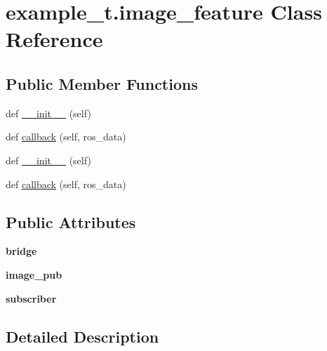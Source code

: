 \hypertarget{classexample__t_1_1image__feature}{}\section{example\+\_\+t.\+image\+\_\+feature Class Reference}
\label{classexample__t_1_1image__feature}
\subsection*{Public Member Functions}
\begin{DoxyCompactItemize}
\item 
def \hyperlink{classexample__t_1_1image__feature_ab7ca3d6ed3e0a021664f3227a389914b}{\+\_\+\+\_\+init\+\_\+\+\_\+} (self)
\item 
def \hyperlink{classexample__t_1_1image__feature_a60a162ed0cac939db1c2bccd3d884ca6}{callback} (self, ros\+\_\+data)
\item 
def \hyperlink{classexample__t_1_1image__feature_ab7ca3d6ed3e0a021664f3227a389914b}{\+\_\+\+\_\+init\+\_\+\+\_\+} (self)
\item 
def \hyperlink{classexample__t_1_1image__feature_a60a162ed0cac939db1c2bccd3d884ca6}{callback} (self, ros\+\_\+data)
\end{DoxyCompactItemize}
\subsection*{Public Attributes}
\begin{DoxyCompactItemize}
\item 
\mbox{\label{classexample__t_1_1image__feature_a9fb59c35bc2b06b5182aa610cd91022e}} 
{\bfseries bridge}
\item 
\mbox{\label{classexample__t_1_1image__feature_aba34fa49601c8c19763cddb71c14dac7}} 
{\bfseries image\+\_\+pub}
\item 
\mbox{\label{classexample__t_1_1image__feature_a2d249499a1bbbf48756925c45a66eeec}} 
{\bfseries subscriber}
\end{DoxyCompactItemize}


\subsection{Detailed Description}


